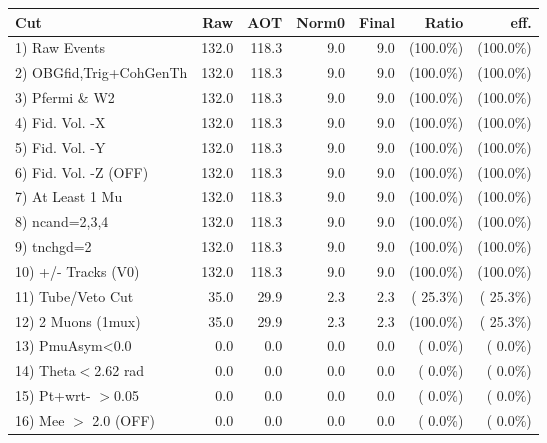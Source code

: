  \begin{table}[h!]\centering
 \begin{tabular}{||l||r|r|r|r|r|r||}
 \hline
 \hline
 Cut & Raw & AOT & Norm0 & Final & Ratio & eff.       \\
 \hline
  1) Raw Events           &        132.0 &        118.3 &          9.0 &          9.0 & (100.0\%) & (100.0\%) \\
  2) OBGfid,Trig+CohGenTh &        132.0 &        118.3 &          9.0 &          9.0 & (100.0\%) & (100.0\%) \\
  3) Pfermi \& W2         &        132.0 &        118.3 &          9.0 &          9.0 & (100.0\%) & (100.0\%) \\
  4) Fid. Vol. -X         &        132.0 &        118.3 &          9.0 &          9.0 & (100.0\%) & (100.0\%) \\
  5) Fid. Vol. -Y         &        132.0 &        118.3 &          9.0 &          9.0 & (100.0\%) & (100.0\%) \\
  6) Fid. Vol. -Z (OFF)   &        132.0 &        118.3 &          9.0 &          9.0 & (100.0\%) & (100.0\%) \\
  7) At Least 1 Mu        &        132.0 &        118.3 &          9.0 &          9.0 & (100.0\%) & (100.0\%) \\
  8) ncand=2,3,4          &        132.0 &        118.3 &          9.0 &          9.0 & (100.0\%) & (100.0\%) \\
  9) tnchgd=2             &        132.0 &        118.3 &          9.0 &          9.0 & (100.0\%) & (100.0\%) \\
 10) +/- Tracks (V0)      &        132.0 &        118.3 &          9.0 &          9.0 & (100.0\%) & (100.0\%) \\
 11) Tube/Veto Cut        &         35.0 &         29.9 &          2.3 &          2.3 & ( 25.3\%) & ( 25.3\%) \\
 12) 2 Muons (1mux)       &         35.0 &         29.9 &          2.3 &          2.3 & (100.0\%) & ( 25.3\%) \\
 13) PmuAsym<0.0          &          0.0 &          0.0 &          0.0 &          0.0 & (  0.0\%) & (  0.0\%) \\
 14) Theta$<$2.62 rad     &          0.0 &          0.0 &          0.0 &          0.0 & (  0.0\%) & (  0.0\%) \\
 15) Pt+wrt- $>$0.05      &          0.0 &          0.0 &          0.0 &          0.0 & (  0.0\%) & (  0.0\%) \\
 16) Mee $>$ 2.0  (OFF)   &          0.0 &          0.0 &          0.0 &          0.0 & (  0.0\%) & (  0.0\%) \\

\end{tabular}
\end{table}

